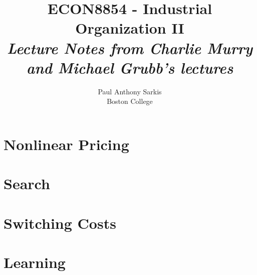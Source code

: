\documentclass[12pt]{report}
\begin{document}
\date{}
\title{\textbf{\huge{ECON8854 - Industrial Organization II}}\\ \textit{Lecture Notes from Charlie Murry and Michael Grubb's lectures}}
\author{Paul Anthony Sarkis\\ Boston College} 
 
\maketitle

\tableofcontents


\chapter{Nonlinear Pricing}


\chapter{Search}



\chapter{Switching Costs}


\chapter{Learning}

\end{document}
